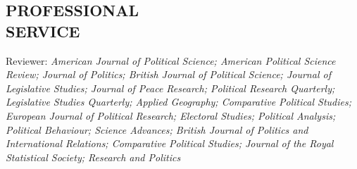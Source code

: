 \documentclass[centered]{res}
\begin{document}
\begin{resume}


%
%



\section{PROFESSIONAL \\ SERVICE}  

\vspace{.5cm}

Reviewer: \emph{American Journal of Political Science; American Political Science Review; Journal of Politics; British Journal of Political Science; Journal of Legislative Studies; Journal of Peace Research; Political Research Quarterly; Legislative Studies Quarterly; Applied Geography; Comparative Political Studies; European Journal of Political Research; Electoral Studies; Political Analysis; Political Behaviour; Science Advances; British Journal of Politics and International Relations; Comparative Political Studies; Journal of the Royal Statistical Society; Research and Politics} 
           

\end{resume}
\end{document}
